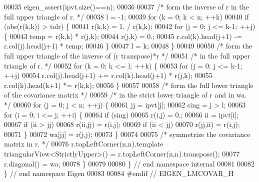 \begin{DoxyCode}
00035     eigen\_assert(ipvt.size()==n);
00036 
00037     \textcolor{comment}{/* form the inverse of r in the full upper triangle of r. */}
00038     l = -1;
00039     \textcolor{keywordflow}{for} (k = 0; k < n; ++k)
00040         \textcolor{keywordflow}{if} (abs(r(k,k)) > tolr) \{
00041             r(k,k) = 1. / r(k,k);
00042             \textcolor{keywordflow}{for} (j = 0; j <= k-1; ++j) \{
00043                 temp = r(k,k) * r(j,k);
00044                 r(j,k) = 0.;
00045                 r.col(k).head(j+1) -= r.col(j).head(j+1) * temp;
00046             \}
00047             l = k;
00048         \}
00049 
00050     \textcolor{comment}{/* form the full upper triangle of the inverse of (r transpose)*r */}
00051     \textcolor{comment}{/* in the full upper triangle of r. */}
00052     \textcolor{keywordflow}{for} (k = 0; k <= l; ++k) \{
00053         \textcolor{keywordflow}{for} (j = 0; j <= k-1; ++j)
00054             r.col(j).head(j+1) += r.col(k).head(j+1) * r(j,k);
00055         r.col(k).head(k+1) *= r(k,k);
00056     \}
00057 
00058     \textcolor{comment}{/* form the full lower triangle of the covariance matrix */}
00059     \textcolor{comment}{/* in the strict lower triangle of r and in wa. */}
00060     \textcolor{keywordflow}{for} (j = 0; j < n; ++j) \{
00061         jj = ipvt[j];
00062         sing = j > l;
00063         \textcolor{keywordflow}{for} (i = 0; i <= j; ++i) \{
00064             \textcolor{keywordflow}{if} (sing)
00065                 r(i,j) = 0.;
00066             ii = ipvt[i];
00067             \textcolor{keywordflow}{if} (ii > jj)
00068                 r(ii,jj) = r(i,j);
00069             \textcolor{keywordflow}{if} (ii < jj)
00070                 r(jj,ii) = r(i,j);
00071         \}
00072         wa[jj] = r(j,j);
00073     \}
00074 
00075     \textcolor{comment}{/* symmetrize the covariance matrix in r. */}
00076     r.topLeftCorner(n,n).template triangularView<StrictlyUpper>() = r.topLeftCorner(n,n).transpose();
00077     r.diagonal() = wa;
00078 \}
00079 
00080 \} \textcolor{comment}{// end namespace internal}
00081 
00082 \} \textcolor{comment}{// end namespace Eigen}
00083 
00084 \textcolor{preprocessor}{#endif // EIGEN\_LMCOVAR\_H}
\end{DoxyCode}
